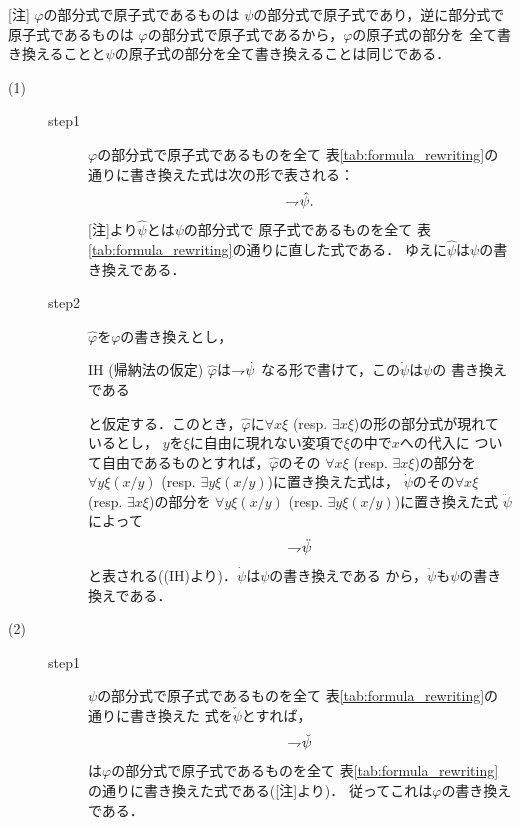 	\begin{metaprf}\mbox{}
		[注] $\varphi$の部分式で原子式であるものは
		$\psi$の部分式で原子式であり，逆に部分式で原子式であるものは
		$\varphi$の部分式で原子式であるから，$\varphi$の原子式の部分を
		全て書き換えることと$\psi$の原子式の部分を全て書き換えることは同じである．
		\begin{description}
			\item[(1)] 
				\begin{description}
					\item[step1]
						$\varphi$の部分式で原子式であるものを全て
						表\ref{tab:formula_rewriting}の通りに書き換えた式は次の形で表される：
						\begin{align}
							\rightharpoondown\hspace{-0.25em} \hat{\psi}.
						\end{align}
						[注]より$\hat{\psi}$とは$\psi$の部分式で
						原子式であるものを全て
						表\ref{tab:formula_rewriting}の通りに直した式である．
						ゆえに$\hat{\psi}$は$\psi$の書き換えである．
						
					\item[step2]
						$\widehat{\varphi}$を$\varphi$の書き換えとし，
						\begin{itembox}[l]{IH (帰納法の仮定)}
							$\widehat{\varphi}$は$\rightharpoondown\hspace{-0.25em} \dot{\psi}$
							なる形で書けて，この$\dot{\psi}$は$\psi$の
							書き換えである
						\end{itembox}
						と仮定する．このとき，$\widehat{\varphi}$に$\forall x \xi$ 
						(resp. $\exists x \xi$)の形の部分式が現れているとし，
						$y$を$\xi$に自由に現れない変項で$\xi$の中で$x$への代入に
						ついて自由であるものとすれば，$\widehat{\varphi}$のその
						$\forall x \xi$ (resp. $\exists x \xi$)の部分を
						$\forall y \xi(x/y)$
						(resp. $\exists y \xi(x/y)$)に置き換えた式は，
						$\dot{\psi}$のその$\forall x \xi$
						(resp. $\exists x \xi$)の部分を
						$\forall y \xi(x/y)$
						(resp. $\exists y \xi(x/y)$)に置き換えた式
						$\ddot{\psi}$によって
						\begin{align}
							\rightharpoondown\hspace{-0.25em} \ddot{\psi}
						\end{align}
						と表される((IH)より)．$\dot{\psi}$は$\psi$の書き換えである
						から，$\ddot{\psi}$も$\psi$の書き換えである．
				\end{description}
				
			\item[(2)]		
				\begin{description}
					\item[step1]
						$\psi$の部分式で原子式であるものを全て
						表\ref{tab:formula_rewriting}の通りに書き換えた
						式を$\check{\psi}$とすれば，
						\begin{align}
							\rightharpoondown\hspace{-0.25em} \check{\psi}
						\end{align}
						は$\varphi$の部分式で原子式であるものを全て
						表\ref{tab:formula_rewriting}の通りに書き換えた式である([注]より)．
						従ってこれは$\varphi$の書き換えである．
								

\end{description}
\end{description}
\end{metaprf}
